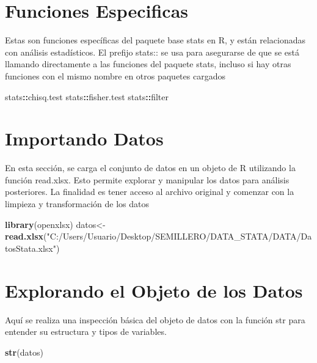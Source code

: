 \documentclass[
]{article}
\newenvironment{Shaded}{\begin{snugshade}}{\end{snugshade}}
\newcommand{\FunctionTok}[1]{\textcolor[rgb]{0.13,0.29,0.53}{\textbf{#1}}}
\newcommand{\NormalTok}[1]{#1}
\newcommand{\OtherTok}[1]{\textcolor[rgb]{0.56,0.35,0.01}{#1}}
\newcommand{\SpecialCharTok}[1]{\textcolor[rgb]{0.81,0.36,0.00}{\textbf{#1}}}
\newcommand{\StringTok}[1]{\textcolor[rgb]{0.31,0.60,0.02}{#1}}
\begin{document}
\section{Funciones Especificas}\label{funciones-especificas}

Estas son funciones específicas del paquete base stats en R, y están
relacionadas con análisis estadísticos. El prefijo stats:: se usa para
asegurarse de que se está llamando directamente a las funciones del
paquete stats, incluso si hay otras funciones con el mismo nombre en
otros paquetes cargados

\begin{Shaded}
\begin{Highlighting}[]
\NormalTok{stats}\SpecialCharTok{::}\NormalTok{chisq.test}
\NormalTok{stats}\SpecialCharTok{::}\NormalTok{fisher.test}
\NormalTok{stats}\SpecialCharTok{::}\NormalTok{filter }
\end{Highlighting}
\end{Shaded}

\section{Importando Datos}\label{importando-datos}

En esta sección, se carga el conjunto de datos en un objeto de R
utilizando la función read.xlsx. Esto permite explorar y manipular los
datos para análisis posteriores. La finalidad es tener acceso al archivo
original y comenzar con la limpieza y transformación de los datos

\begin{Shaded}
\begin{Highlighting}[]
\FunctionTok{library}\NormalTok{(openxlsx)}
\NormalTok{datos}\OtherTok{\textless{}{-}}\FunctionTok{read.xlsx}\NormalTok{(}\StringTok{"C:/Users/Usuario/Desktop/SEMILLERO/DATA\_STATA/DATA/DatosStata.xlsx"}\NormalTok{)}
\end{Highlighting}
\end{Shaded}

\section{Explorando el Objeto de los
Datos}\label{explorando-el-objeto-de-los-datos}

Aquí se realiza una inspección básica del objeto de datos con la función
str para entender su estructura y tipos de variables.

\begin{Shaded}
\begin{Highlighting}[]
\FunctionTok{str}\NormalTok{(datos)}
\end{Highlighting}
\end{Shaded}
\end{document}
